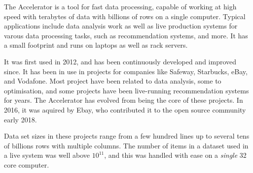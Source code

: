 
The Accelerator is a tool for fast data processing, capable of working
at high speed with terabytes of data with billions of rows on a single
computer.  Typical applications include data analysis work as well as
live production systems for varous data processing tasks, such as
recommendation systems, and more.  It has a small footprint and runs
on laptops as well as rack servers.

It was first used in 2012, and has been continuously developed and
improved since.  It has been in use in projects for companies like
Safeway, Starbucks, eBay, and Vodafone.  Most project have been
related to data analysis, some to optimisation, and some projects have
been live-running recommendation systems for years.  The Accelerator
has evolved from being the core of these projects.  In 2016, it was
aquired by Ebay, who contributed it to the open source community early
2018.

Data set sizes in these projects range from a few hundred lines up to
several tens of billions rows with multiple columns.  The number of
items in a dataset used in a live system was well above $10^{11}$, and
this was handled with ease on a \emph{single} 32 core computer.

